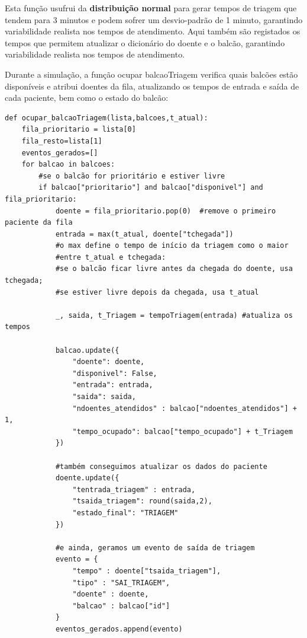 \documentclass[12pt,a4paper]{article} %
\begin{document}
    Esta função usufrui da \textbf{distribuição normal} para gerar tempos de triagem que tendem para 3 minutos e podem sofrer um desvio-padrão de 1 minuto, garantindo variabilidade realista nos tempos de atendimento. Aqui também são registados os tempos que permitem atualizar o dicionário do doente e o balcão, garantindo variabilidade realista nos tempos de atendimento.
    
    \medskip
    Durante a simulação, a função ocupar balcaoTriagem verifica quais balcões estão disponíveis e atribui doentes da fila, atualizando os tempos de entrada e saída de cada paciente, bem como o estado do balcão:
    
    \hypertarget{ocupa_balcao}{}
\begin{verbatim}
def ocupar_balcaoTriagem(lista,balcoes,t_atual):
    fila_prioritario = lista[0]
    fila_resto=lista[1]
    eventos_gerados=[]
    for balcao in balcoes:
        #se o balcão for prioritário e estiver livre
        if balcao["prioritario"] and balcao["disponivel"] and fila_prioritario:
            doente = fila_prioritario.pop(0)  #remove o primeiro paciente da fila
            entrada = max(t_atual, doente["tchegada"])   
            #o max define o tempo de início da triagem como o maior 
            #entre t_atual e tchegada: 
            #se o balcão ficar livre antes da chegada do doente, usa tchegada; 
            #se estiver livre depois da chegada, usa t_atual

            _, saida, t_Triagem = tempoTriagem(entrada) #atualiza os tempos

            balcao.update({
                "doente": doente,
                "disponivel": False,
                "entrada": entrada,
                "saida": saida,
                "ndoentes_atendidos" : balcao["ndoentes_atendidos"] + 1,
                "tempo_ocupado": balcao["tempo_ocupado"] + t_Triagem
            })

            #também conseguimos atualizar os dados do paciente
            doente.update({ 
                "tentrada_triagem" : entrada,
                "tsaida_triagem": round(saida,2),
                "estado_final": "TRIAGEM"
            })

            #e ainda, geramos um evento de saída de triagem
            evento = {
                "tempo" : doente["tsaida_triagem"],
                "tipo" : "SAI_TRIAGEM",
                "doente" : doente,
                "balcao" : balcao["id"]
            }
            eventos_gerados.append(evento)


\end{verbatim}
\end{document}
